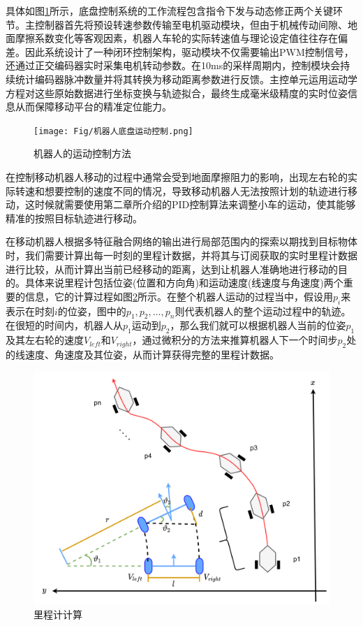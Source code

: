 具体如图\ref{motion_control}所示，底盘控制系统的工作流程包含指令下发与动态修正两个关键环节。主控制器首先将预设转速参数传输至电机驱动模块，但由于机械传动间隙、地面摩擦系数变化等客观因素，机器人车轮的实际转速值与理论设定值往往存在偏差。因此系统设计了一种闭环控制架构，驱动模块不仅需要输出PWM控制信号，还通过正交编码器实时采集电机转动参数。在10ms的采样周期内，控制模块会持续统计编码器脉冲数量并将其转换为移动距离参数进行反馈。主控单元运用运动学方程对这些原始数据进行坐标变换与轨迹拟合，最终生成毫米级精度的实时位姿信息从而保障移动平台的精准定位能力。


\begin{figure}[htbp]
    \centering
    \texttt{[image: Fig/机器人底盘运动控制.png]}
    \caption{\label{motion_control}机器人的运动控制方法}
\end{figure}

在控制移动机器人移动的过程中通常会受到地面摩擦阻力的影响，出现左右轮的实际转速和想要控制的速度不同的情况，导致移动机器人无法按照计划的轨迹进行移动，这时候就需要使用第二章所介绍的PID控制算法来调整小车的运动，使其能够精准的按照目标轨迹进行移动。


在移动机器人根据多特征融合网络的输出进行局部范围内的探索以期找到目标物体时，我们需要计算出每一时刻的里程计数据，并将其与订阅获取的实时里程计数据进行比较，从而计算出当前已经移动的距离，达到让机器人准确地进行移动的目的。具体来说里程计包括位姿(位置和方向角)和运动速度(线速度与角速度)两个重要的信息，它的计算过程如图\ref{motion_calculate}所示。在整个机器人运动的过程当中，假设用${p_i}$来表示在时刻$i$的位姿，图中的${p_1},{p_2}, \ldots ,{p_n}$则代表机器人的整个运动过程中的轨迹。在很短的时间内，机器人从${p_1}$运动到${p_2}$，那么我们就可以根据机器人当前的位姿${p_1}$及其左右轮的速度${V_{left}}$和${V_{right}}$，通过微积分的方法来推算机器人下一个时间步${p_2}$处的线速度、角速度及其位姿，从而计算获得完整的里程计数据。
\begin{figure}[htbp]
    \centering
    \includegraphics[scale=0.05]{Fig/移动控制.png}
    \caption{\label{motion_calculate}里程计计算}
\end{figure}

